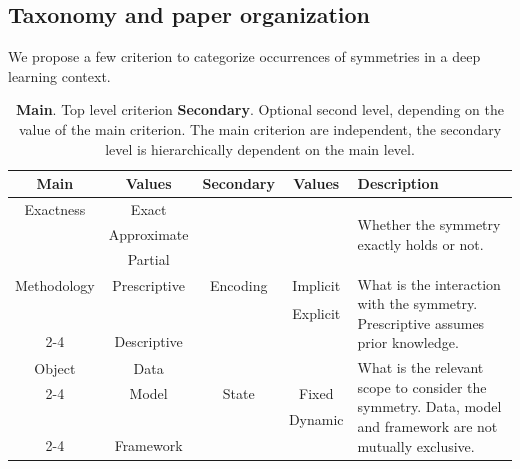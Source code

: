 \documentclass[mathematics,review,submit,moreauthors]{Definitions/mdpi}
\begin{document}
\subsection{Taxonomy and paper organization}

We propose a few criterion to categorize occurrences of symmetries in a deep learning context.


\begin{table}[ht]
    \centering
    \begin{tabularx}{\textwidth}{|c|c|c|c|X|}
        \hline
        \textbf{Main} & \textbf{Values} & \textbf{Secondary} & \textbf{Values} & \textbf{Description} \\
        \hline
        Exactness & Exact       &          &          & \multirow{3}{=}{Whether the symmetry exactly holds or not.} \\
                  & Approximate &          &          & \\ %
                  & Partial &          &          & \\ %
        \hline
        Methodology & Prescriptive & Encoding & Implicit & \multirow{3}{=}{What is the interaction with the symmetry. Prescriptive assumes prior knowledge.} \\
                    &              &          & Explicit & \\ %
        \cline{2-4}
                    & Descriptive &  &  & \\
        \hline
        Object & Data & & & \multirow{4}{=}{What is the relevant scope to consider the symmetry. Data, model and framework are not mutually exclusive.} \\
        \cline{2-4}
               & Model & State & Fixed & \\
               &       &       & Dynamic & \\
        \cline{2-4}
               & Framework      &       & &\\
        \hline
    \end{tabularx}
    \caption{\textbf{Main}. Top level criterion \textbf{Secondary}. Optional second level, depending on the value of the main criterion. The main criterion are independent, the secondary level is hierarchically dependent on the main level.}
    \label{table:taxonomy}
\end{table}
\end{document}
